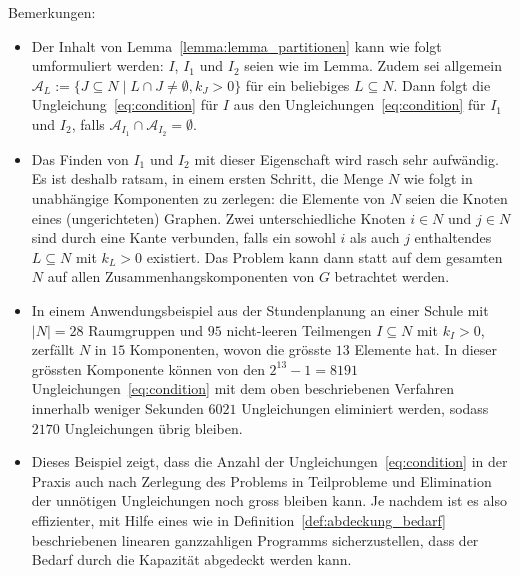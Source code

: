 \documentclass{article}
\begin{document}
	Bemerkungen:
	\begin{itemize}
		\item Der Inhalt von Lemma~\ref{lemma:lemma_partitionen} kann wie folgt umformuliert werden: $I$, $I_1$ und $I_2$ seien wie im Lemma. Zudem sei allgemein $\mathcal{A}_L:=\{J\subseteq N \;|\; L\cap J\neq \emptyset, k_J>0\}$ für ein beliebiges $L\subseteq N$. Dann folgt die Ungleichung~\ref{eq:condition} für $I$ aus den Ungleichungen~\ref{eq:condition} für $I_1$ und $I_2$, falls $\mathcal{A}_{I_1}\cap \mathcal{A}_{I_2}=\emptyset$.
		\item Das Finden von $I_1$ und $I_2$ mit dieser Eigenschaft wird rasch sehr aufwändig. Es ist deshalb ratsam, in einem ersten Schritt, die Menge $N$ wie folgt in unabhängige Komponenten zu zerlegen: die Elemente von $N$ seien die Knoten eines (ungerichteten) Graphen. Zwei unterschiedliche Knoten $i\in N$ und $j\in N$ sind durch eine Kante verbunden, falls ein sowohl $i$ als auch $j$ enthaltendes $L\subseteq N$ mit $k_L > 0$ existiert. Das Problem kann dann statt auf dem gesamten $N$ auf allen Zusammenhangskomponenten von $G$ betrachtet werden.
		\item In einem Anwendungsbeispiel aus der Stundenplanung an einer Schule mit $|N|=28$ Raumgruppen und $95$ nicht-leeren Teilmengen $I\subseteq N$ mit $k_I > 0$, zerfällt $N$ in $15$ Komponenten, wovon die grösste $13$ Elemente hat. In dieser grössten Komponente können von den $2^{13} - 1=8191$ Ungleichungen~\ref{eq:condition} mit dem oben beschriebenen Verfahren innerhalb weniger Sekunden $6021$ Ungleichungen eliminiert werden, sodass $2170$ Ungleichungen übrig bleiben.
		\item Dieses Beispiel zeigt, dass die Anzahl der Ungleichungen~\ref{eq:condition} in der Praxis auch nach Zerlegung des Problems in Teilprobleme und Elimination der unnötigen Ungleichungen noch gross bleiben kann. Je nachdem ist es also effizienter, mit Hilfe eines  wie in Definition~\ref{def:abdeckung_bedarf} beschriebenen linearen ganzzahligen Programms sicherzustellen, dass der Bedarf durch die Kapazität abgedeckt werden kann.
	\end{itemize}
	
\end{document}
